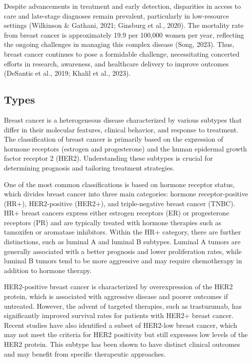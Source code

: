 Despite advancements in treatment and early detection, disparities in access to
care and late-stage diagnoses remain prevalent, particularly in low-resource
settings (Wilkinson \& Gathani, 2021; Ginsburg et al., 2020).
The mortality rate from breast cancer is approximately 19.9 per 100,000 women
per year, reflecting the ongoing challenges in managing this complex disease
(Song, 2023).
Thus, breast cancer continues to pose a formidable challenge, necessitating
concerted efforts in research, awareness, and healthcare delivery to improve
outcomes (DeSantis et al., 2019; Khalil et al., 2023).

\subsection{Types}

Breast cancer is a heterogeneous disease characterized by various subtypes that
differ in their molecular features, clinical behavior, and response to
treatment.
The classification of breast cancer is primarily based on the expression of
hormone receptors (estrogen and progesterone) and the human epidermal growth
factor receptor 2 (HER2).
Understanding these subtypes is crucial for determining prognosis and tailoring
treatment strategies.

One of the most common classifications is based on hormone receptor status,
which divides breast cancer into three main categories: hormone
receptor-positive (HR+), HER2-positive (HER2+), and triple-negative breast
cancer (TNBC).
HR+ breast cancers express either estrogen receptors (ER) or progesterone
receptors (PR) and are typically treated with hormone therapies such as
tamoxifen or aromatase inhibitors\supercite{geyer_molecular_2012}.
Within the HR+ category, there are further distinctions, such as luminal A and
luminal B subtypes.
Luminal A tumors are generally associated with a better prognosis and lower
proliferation rates, while luminal B tumors tend to be more aggressive and may
require chemotherapy in addition to hormone
therapy\supercite{geyer_molecular_2012}.

HER2-positive breast cancer is characterized by overexpression of the HER2
protein, which is associated with aggressive disease and poorer outcomes if
untreated.
However, the advent of targeted therapies, such as trastuzumab, has
significantly improved survival rates for patients with HER2+ breast
cancer\supercite{modi_antitumor_2020}.
Recent studies have also identified a subset of HER2-low breast cancer, which
may not meet the criteria for HER2 positivity but still expresses low levels of
the HER2 protein.
This subtype has been shown to have distinct clinical outcomes and may benefit
from specific therapeutic
approaches\supercite{won_clinical_2022,mutai_prognostic_2021}.


